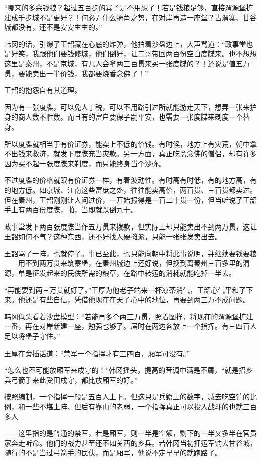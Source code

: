 “哪来的多余钱粮？超过五百步的寨子是不用想了！若是钱粮足够，直接渭源堡扩建成千步城不是更好？！何必弄什么犄角之势，在对岸再造一座堡？古渭寨、甘谷城都没有，还不是安安生生的。”

韩冈的话，引爆了王韶藏在心底的炸弹，他拍着沙盘边上，大声骂道：“政事堂也是好笑，我跟他们要钱修城，他们倒好，让二哥带回两百份空白度牒来。也不想想这里是秦州，不是京城，有几人会拿两三百贯来买一张度牒的？！还说是值五万贯，要能卖出一半价钱，我都要烧香念佛了！”

王韶的抱怨自有其道理。

因为有一张度牒，可以免人丁税，可以不用路引过所就能游走天下，想弄一张来护身的商人数不胜数。而且有的富户要保子嗣平安，也需要一张度牒来剃度一个替身。

所以度牒就相当于有价证券，能卖上不低的价钱。有时候，地方上有灾荒，朝中拿不出钱来救济，就发下度牒充当灾款。另一方面，真正吃斋念佛的僧侣，却有许多因为买不起一张度牒来剃度，而只能终身当个沙弥。

不过度牒的价格就跟有价证券一样，有着波动性。有时高有时低，有的地方高，有的地方低。如京城、江南这些富庶之处，往往能卖高价，两百贯、三百贯都卖过。但在秦州，王韶刚刚让人问过价，一开始报得是一百二十贯一份，但当听说了王韶手上有两百份度牒，啪，当即就跌倒九十。

政事堂发下两百张度牒当作五万贯来拨款，但实际上却只能卖出不到两万贯，这让王韶如何不气？这种东西，还不好找人硬摊派，只能一张张发卖出去。

王韶骂了一阵，也就停了。事已至此，也只能向朝中将此事说明，并继续要钱要粮——用不到两万贯来筑寨堡，在秦州城边上还好说，但换到离秦州三百多里的渭源，单是征发起来的民伕所需的粮草，在路中转运的消耗就能吃掉一半去。

“再能要到两三万贯就好了。”王厚为他老子端来一杯凉茶消气，王韶心气平和了下来。他还是有些自信，凭借他现在在天子心中的地位，再要到两三万不成问题。

韩冈低头看着沙盘模型：“若能再多个两三万贯，照着图样，将现在的渭源堡扩建一番，再在对岸新建一座，勉强也够了。届时在两边各放上一个指挥。有三四百人足以将堡子守住。”

王厚在旁插话道：“禁军一个指挥才有三四百，厢军可没有。”

“怎么也不可能放厢军来戍守的！”韩冈摇头，提高的音调中满是不屑，“就是招乡兵弓箭手来此受田戍守，都比放厢军的好。”

按照编制，一个指挥一般是五百人上下。但这只是兵籍上的数字，减去吃空饷的比例，和一些不堪上阵、但后有靠山的老弱，一个指挥真正可以投入战斗的也就三百多人

——这里指的是普通的禁军，若是厢军，则一半是空额，剩下的一半又多半在官员家奔走听命。他们的战力甚至还不如关西的乡兵。若韩冈当初押运军饷去甘谷城，随行的不是当过弓箭手的民伕，而是厢军，他说不定早早的就跑路了。

